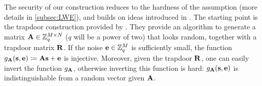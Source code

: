 The security of our construction reduces to the hardness of the \LWE{} assumption (more details in \cref{subsec:LWE}), and builds on ideas introduced in \cite{CCKW_2019_qfactory}. The starting point is the trapdoor construction provided by \cite{MP11}. They provide an algorithm to generate a matrix $\mathbf{A} \in \mathbb{Z}_q^{M \times N}$ ($q$ will be a power of two) that looks random, together with a trapdoor matrix $\mathbf{R}$. If the noise $\mathbf{e} \in \mathbb{Z}_q^M$ is sufficiently small, the function $g_{\mathbf{A}}(\mathbf{s}, \mathbf{e}) \coloneqq \mathbf{A}\mathbf{s} + \mathbf{e}$ is injective. Moreover, given the trapdoor $\mathbf{R}$, one can easily invert the function $g_{\mathbf{A}}$, otherwise inverting this function is hard: $g_{\mathbf{A}}(\mathbf{s}, \mathbf{e})$ is indistinguishable from a random vector given $\mathbf{A}$.

